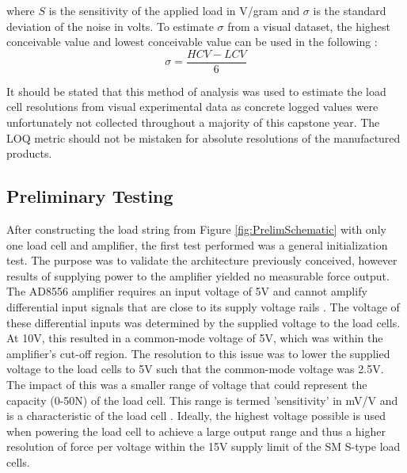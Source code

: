 where $S$ is the sensitivity of the applied load in V/gram and $\sigma$ is the standard deviation of the noise in volts. To estimate $\sigma$ from a visual dataset, the highest conceivable value and lowest conceivable value can be used in the following \cite{SigmaEstimation}:
\begin{equation}
    \sigma = \frac{HCV - LCV}{6}
\end{equation}

It should be stated that this method of analysis was used to estimate the load cell resolutions from visual experimental data as concrete logged values were unfortunately not collected throughout a majority of this capstone year. The LOQ metric should not be mistaken for absolute resolutions of the manufactured products.

\subsection{Preliminary Testing}
After constructing the load string from Figure \ref{fig:PrelimSchematic} with only one load cell and amplifier, the first test performed was a general initialization test. The purpose was to validate the architecture previously conceived, however results of supplying power to the amplifier yielded no measurable force output. The AD8556 amplifier requires an input voltage of 5V and cannot amplify differential input signals that are close to its supply voltage rails \cite{Analog_AD8556_Datasheet}. The voltage of these differential inputs was determined by the supplied voltage to the load cells. At 10V, this resulted in a common-mode voltage of 5V, which was within the amplifier's cut-off region. The resolution to this issue was to lower the supplied voltage to the load cells to 5V such that the common-mode voltage was 2.5V. The impact of this was a smaller range of voltage that could represent the capacity (0-50N) of the load cell. This range is termed 'sensitivity' in mV/V and is a characteristic of the load cell \cite{Interface_SM_SType}. Ideally, the highest voltage possible is used when powering the load cell to achieve a large output range and thus a higher resolution of force per voltage within the 15V supply limit of the SM S-type load cells.

